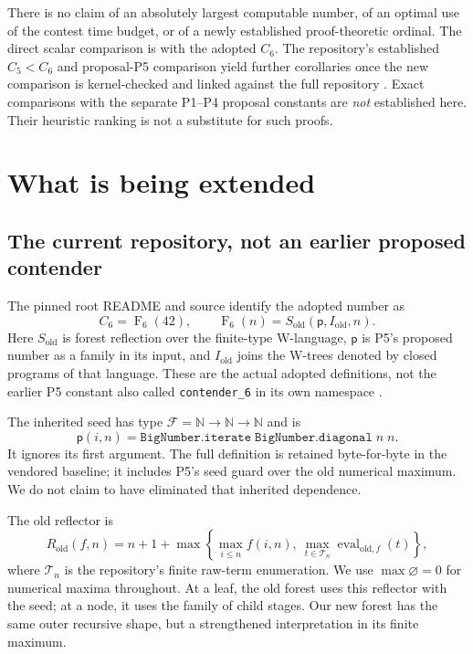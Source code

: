 \documentclass[11pt,letterpaper]{article}
\theoremstyle{definition}
\newcommand{\N}{\mathbb N}
\newcommand{\Fam}{\mathcal F}
\newcommand{\Eval}{\operatorname{eval}}
\newcommand{\ps}{\mathsf p}
\newcommand{\FF}{\operatorname{F}}
\newcommand{\code}[1]{\texttt{#1}}
\begin{document}
There is no claim of an absolutely largest computable number, of an optimal
use of the contest time budget, or of a newly established proof-theoretic
ordinal. The direct scalar comparison is with the adopted $C_6$. The
repository's established $C_5<C_6$ and proposal-P5 comparison yield further
corollaries once the new comparison is kernel-checked and linked against the
full repository \cite{repo-comparison}. Exact comparisons with the separate P1--P4 proposal
constants are \emph{not} established here. Their heuristic ranking is not a
substitute for such proofs.

\section{What is being extended}
\label{sec:baseline}

\subsection{The current repository, not an earlier proposed contender}

The pinned root README and source identify the adopted number as
\begin{equation}\label{eq:old}
 C_6=\FF_6(42),\qquad
 \FF_6(n)=S_{\mathrm{old}}(\ps,I_{\mathrm{old}},n).
\end{equation}
Here $S_{\mathrm{old}}$ is forest reflection over the finite-type W-language,
$\ps$ is P5's proposed number as a family in its input, and
$I_{\mathrm{old}}$ joins the W-trees denoted by closed programs of that
language. These are the actual adopted definitions, not the earlier P5
constant also called \code{contender\_6} in its own namespace
\cite{repo-readme,repo-c6,repo-reflection,p5-defs}.

The inherited seed has type $\Fam=\N\to\N\to\N$ and is
\[
 \ps(i,n)=\code{BigNumber.iterate}\;
           \code{BigNumber.diagonal}\;n\;n.
\]
It ignores its first argument. The full definition is retained byte-for-byte
in the vendored baseline; it includes P5's seed guard over the old numerical
maximum. We do not claim to have eliminated that inherited dependence.

The old reflector is
\begin{equation}\label{eq:old-reflection}
 R_{\mathrm{old}}(f,n)=n+1+
 \max\left\{\max_{i\le n}f(i,n),\
      \max_{t\in\mathcal T_n}\Eval_{\mathrm{old},f}(t)\right\},
\end{equation}
where $\mathcal T_n$ is the repository's finite raw-term enumeration. We use
$\max\varnothing=0$ for numerical maxima throughout. At a
leaf, the old forest uses this reflector with the seed; at a node, it uses the
family of child stages. Our new forest has the same outer recursive shape,
but a strengthened interpretation in its finite maximum.
\end{document}
